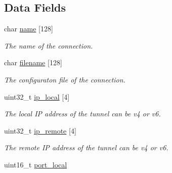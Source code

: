 \subsection*{Data Fields}
\begin{DoxyCompactItemize}
\item 
\hypertarget{structconnection__struct_a93a4209b66c75fd711969ba8dcd926f5}{char \hyperlink{structconnection__struct_a93a4209b66c75fd711969ba8dcd926f5}{name} \mbox{[}128\mbox{]}}\label{structconnection__struct_a93a4209b66c75fd711969ba8dcd926f5}

\begin{DoxyCompactList}\small\item\em The name of the connection. \end{DoxyCompactList}\item 
\hypertarget{structconnection__struct_ad9769d3d3ba7e8920ae13e0f71e0ca6e}{char \hyperlink{structconnection__struct_ad9769d3d3ba7e8920ae13e0f71e0ca6e}{filename} \mbox{[}128\mbox{]}}\label{structconnection__struct_ad9769d3d3ba7e8920ae13e0f71e0ca6e}

\begin{DoxyCompactList}\small\item\em The configuraton file of the connection. \end{DoxyCompactList}\item 
\hypertarget{structconnection__struct_ad51f6dc7a8badde7dea8df80f546c879}{uint32\-\_\-t \hyperlink{structconnection__struct_ad51f6dc7a8badde7dea8df80f546c879}{ip\-\_\-local} \mbox{[}4\mbox{]}}\label{structconnection__struct_ad51f6dc7a8badde7dea8df80f546c879}

\begin{DoxyCompactList}\small\item\em The local I\-P address of the tunnel can be v4 or v6. \end{DoxyCompactList}\item 
\hypertarget{structconnection__struct_a54a3f7add1f1d4f2d3f00c09df51eee2}{uint32\-\_\-t \hyperlink{structconnection__struct_a54a3f7add1f1d4f2d3f00c09df51eee2}{ip\-\_\-remote} \mbox{[}4\mbox{]}}\label{structconnection__struct_a54a3f7add1f1d4f2d3f00c09df51eee2}

\begin{DoxyCompactList}\small\item\em The remote I\-P address of the tunnel can be v4 or v6. \end{DoxyCompactList}\item 
\hypertarget{structconnection__struct_ac8082e5e25681c11e6e2a89a4c0f6fb4}{uint16\-\_\-t \hyperlink{structconnection__struct_ac8082e5e25681c11e6e2a89a4c0f6fb4}{port\-\_\-local}}\label{structconnection__struct_ac8082e5e25681c11e6e2a89a4c0f6fb4}


\end{DoxyCompactItemize}

